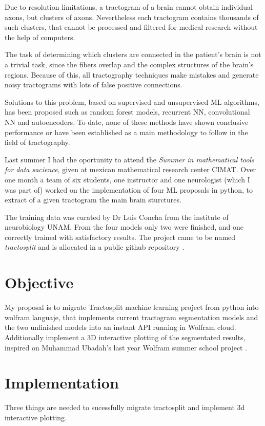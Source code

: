 \documentclass[conference]{IEEEtran}
\begin{document}
Due to resolution limitations, a tractogram of a brain cannot obtain individual axons, but clusters of axons. Nevertheless each tractogram contains thousands of such clusters, that cannot be processed and filtered for medical research without the help of computers.

The task of determining which clusters are connected in the patient's brain is not a trivial task, since the fibers overlap and the complex structures of the brain's regions. Because of this, all tractography techniques make mistakes and generate noisy tractograms with lots of false positive connections.

Solutions to this problem, based on supervised and unsupervised ML algorithms, has been proposed such as random forest models, recurrent NN, convolutional NN and autoencoders. To date, none of these methods have shown conclusive performance or have been established as a main methodology to follow in the field of tractography.

Last summer I had the oportunity to attend the \textit{Summer in mathematical tools for data sacience}, given at mexican mathematical research center CIMAT. Over one month a team of six students, one instructor and one neurologist (which I was part of) worked on the implementation of four ML proposals in python, to extract of a given tractogram the main brain sturctures.

The training data was curated by Dr Luis Concha from the institute of neurobiology UNAM. From the four models only two were finished, and one correctly trained with satisfactory results. The project came to be named \textit{tractosplit} and is allocated in a public github repository \cite{b1}.

%
%
\section{Objective}
My proposal is to migrate Tractosplit machine learning project from python into wolfram languaje, that implements current tractogram segmentation models and the two unfinished models into an instant API running in Wolfram cloud. Additionally implement a 3D interactive plotting of the segmentated results, inspired on Muhammad Ubadah's last year Wolfram summer school project \cite{b2}.

%
%
\section{Implementation}
Three things are needed to sucessfully migrate tractosplit and implement 3d interactive plotting.
\end{document}
